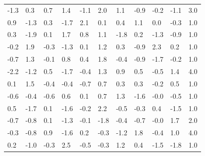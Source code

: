 \begin{center}
\begin{tabular}{@{}lllllllllll@{}}
-1.3 & 0.3 & 0.7 & 1.4 & -1.1 & 2.0 & 1.1 & -0.9 & -0.2 & -1.1 & 3.0 \\
0.9 & -1.3 & 0.3 & -1.7 & 2.1 & 0.1 & 0.4 & 1.1 & 0.0 & -0.3 & 1.0 \\
0.3 & -1.9 & 0.1 & 1.7 & 0.8 & 1.1 & -1.8 & 0.2 & -1.3 & -0.9 & 1.0 \\
-0.2 & 1.9 & -0.3 & -1.3 & 0.1 & 1.2 & 0.3 & -0.9 & 2.3 & 0.2 & 1.0 \\
-0.7 & 1.3 & -0.1 & 0.8 & 0.4 & 1.8 & -0.4 & -0.9 & -1.7 & -0.2 & 1.0 \\
-2.2 & -1.2 & 0.5 & -1.7 & -0.4 & 1.3 & 0.9 & 0.5 & -0.5 & 1.4 & 4.0 \\
0.1 & 1.5 & -0.4 & -0.4 & -0.7 & 0.7 & 0.3 & 0.3 & -0.2 & 0.5 & 1.0 \\
-0.6 & -0.4 & -0.6 & 0.6 & 0.1 & 0.7 & 1.3 & -1.6 & -0.0 & -0.5 & 1.0 \\
0.5 & -1.7 & 0.1 & -1.6 & -0.2 & 2.2 & -0.5 & -0.3 & 0.4 & -1.5 & 1.0 \\
-0.7 & -0.8 & 0.1 & -1.3 & -0.1 & -1.8 & -0.4 & -0.7 & -0.0 & 1.7 & 2.0 \\
-0.3 & -0.8 & 0.9 & -1.6 & 0.2 & -0.3 & -1.2 & 1.8 & -0.4 & 1.0 & 4.0 \\
0.2 & -1.0 & -0.3 & 2.5 & -0.5 & -0.3 & 1.2 & 0.4 & -1.5 & -1.8 & 1.0 \\
 \bottomrule
\end{tabular}
\end{center}

